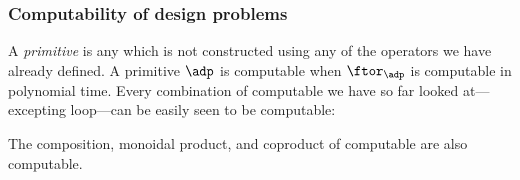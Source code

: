 \subsubsection{Computability of  design problems}

A \emph{primitive}  is any  which is not constructed using any of the operators we have already defined.
A primitive  $\adp$ is computable when $\ftor_\adp$ is computable in polynomial time.
Every combination of computable  we have so far looked at---excepting loop---can be easily seen to be computable:

\begin{proposition}\label{prop:computable-compositions}
    The composition, monoidal product, and coproduct of computable  are also computable.
\end{proposition}

